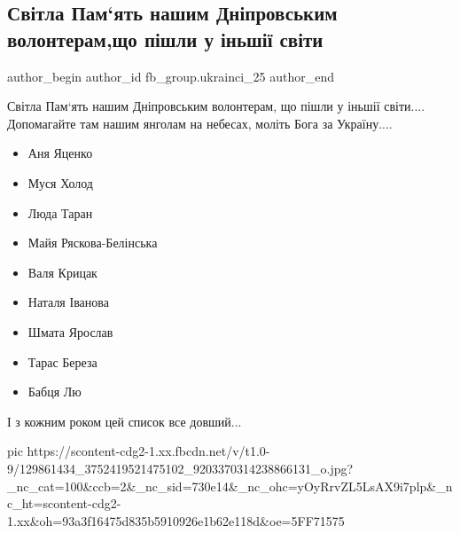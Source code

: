  
 
 
 
 
 
\subsection{Світла Пам`ять нашим Дніпровським волонтерам,що пішли у іньшії світи}
\label{sec:05_12_2020.fb.fb_group.ukrainci_25.1.volontery}
\ifcmt
	author_begin
   author_id fb_group.ukrainci_25
	author_end
\fi

Світла Пам`ять нашим Дніпровським волонтерам, що пішли у іньшії світи....
Допомагайте там нашим янголам на небесах, моліть Бога за Україну....

\begin{itemize}
  \item Аня Яценко
  \item Муся Холод
  \item Люда Таран
  \item Майя Ряскова-Белінська
  \item Валя Крицак
  \item Наталя Іванова
  \item Шмата Ярослав
  \item Тарас Береза
  \item Бабця Лю
\end{itemize}
І з кожним роком цей список все довший...

\ifcmt
pic https://scontent-cdg2-1.xx.fbcdn.net/v/t1.0-9/129861434_3752419521475102_9203370314238866131_o.jpg?_nc_cat=100&ccb=2&_nc_sid=730e14&_nc_ohc=yOyRrvZL5LsAX9i7plp&_nc_ht=scontent-cdg2-1.xx&oh=93a3f16475d835b5910926e1b62e118d&oe=5FF71575
\fi
